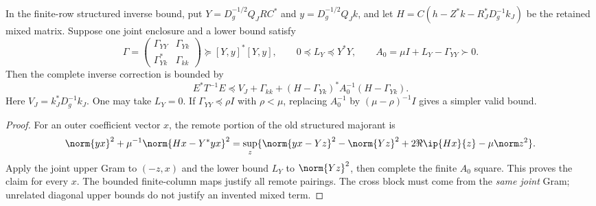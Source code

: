 \begin{proposition}
\label{prop:v125-joint-remote}
In the finite-row structured inverse bound, put
$Y=D_g^{-1/2}Q_JRC^*$ and $y=D_g^{-1/2}Q_Jk$, and let
$H=C(h-Z^*k-R_J^*D_g^{-1}k_J)$ be the retained mixed matrix.
Suppose one joint enclosure and a lower bound satisfy
\[
 \Gamma=\begin{pmatrix}\Gamma_{YY}&\Gamma_{Yk}\\
 \Gamma_{Yk}^*&\Gamma_{kk}\end{pmatrix}
 \succeq [Y,y]^*[Y,y],\qquad 0\preceq L_Y\preceq Y^*Y,
 \qquad A_0=\mu I+L_Y-\Gamma_{YY}\succ0.
\]
Then the complete inverse correction is bounded by
\begin{equation}\label{eq:v125-joint-remote}
 E^*T^{-1}E\preceq V_J+\Gamma_{kk}
 +(H-\Gamma_{Yk})^*A_0^{-1}(H-\Gamma_{Yk}).
\end{equation}
Here $V_J=k_J^*D_g^{-1}k_J$.  One may take $L_Y=0$.
If $\Gamma_{YY}\preceq\rho I$ with $\rho<\mu$, replacing
$A_0^{-1}$ by $(\mu-\rho)^{-1}I$ gives a simpler valid bound.
\end{proposition}
\begin{proof}
For an outer coefficient vector $x$, the remote portion of the old
structured majorant is
\[
 \norm{yx}^2+\mu^{-1}\norm{Hx-Y^*yx}^2
 =\sup_z\{\norm{yx-Yz}^2-\norm{Yz}^2
       +2\Re\ip{Hx}{z}-\mu\norm z^2\}.
\]
Apply the joint upper Gram to $(-z,x)$ and the lower bound $L_Y$
to $\norm{Yz}^2$, then complete the finite $A_0$ square.
This proves the claim for every $x$.  The bounded finite-column maps
justify all remote pairings.  The cross block must come from the
\emph{same joint} Gram; unrelated diagonal upper bounds do not
justify an invented mixed term.
\end{proof}

